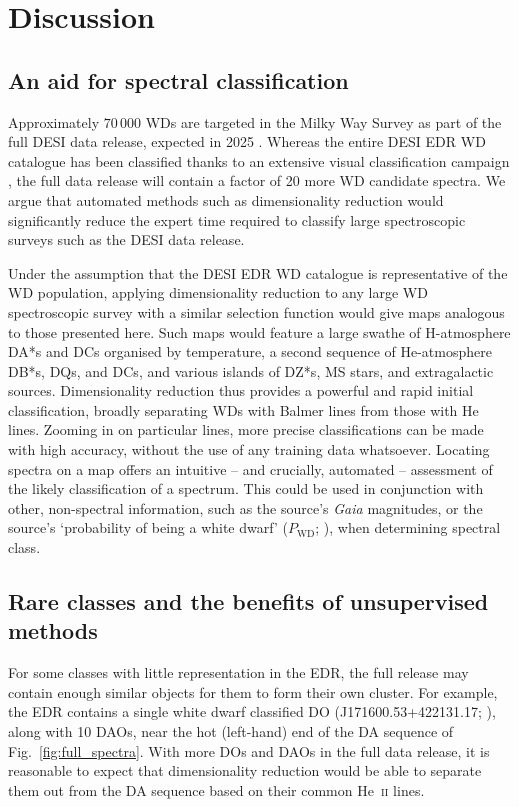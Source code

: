 \documentclass[fleqn,usenatbib]{mnras}
\begin{document}
\section{Discussion}
\label{sec:discussion}

\subsection{An aid for spectral classification}

Approximately $70\,000$ WDs are targeted in the Milky Way Survey as part of the full DESI data release, expected in 2025 \citep{cooper23}.
Whereas the entire DESI EDR WD catalogue has been classified thanks to an extensive visual classification campaign \citep{manser24}, the full data release will contain a factor of 20 more WD candidate spectra.
We argue that automated methods such as dimensionality reduction would significantly reduce the expert time required to classify large spectroscopic surveys such as the DESI data release.

Under the assumption that the DESI EDR WD catalogue is representative of the WD population, applying dimensionality reduction to any large WD spectroscopic survey with a similar selection function would give maps analogous to those presented here.
Such maps would feature a large swathe of H-atmosphere DA*s and DCs organised by temperature, a second sequence of He-atmosphere DB*s, DQs, and DCs, and various islands of DZ*s, MS stars, and extragalactic sources.
Dimensionality reduction thus provides a powerful and rapid initial classification, broadly separating WDs with Balmer lines from those with He lines.
Zooming in on particular lines, more precise classifications can be made with high accuracy, without the use of any training data whatsoever.
Locating spectra on a map offers an intuitive -- and crucially, automated -- assessment of the likely classification of a spectrum.
This could be used in conjunction with other, non-spectral information, such as the source's \textit{Gaia} magnitudes, or the source's `probability of being a white dwarf' ($P_\text{WD}$; \citealt{gentilefusillo15}), when determining spectral class.

\subsection{Rare classes and the benefits of unsupervised methods}
\label{sec:rare}

For some classes with little representation in the EDR, the full release may contain enough similar objects for them to form their own cluster.
For example, the EDR contains a single white dwarf classified DO (J171600.53+422131.17; \citealt{manser24}), along with 10 DAOs, near the hot (left-hand) end of the DA sequence of Fig.~\ref{fig:full_spectra}.
With more DOs and DAOs in the full data release, it is reasonable to expect that dimensionality reduction would be able to separate them out from the DA sequence based on their common He~\textsc{ii} lines.
\end{document}
